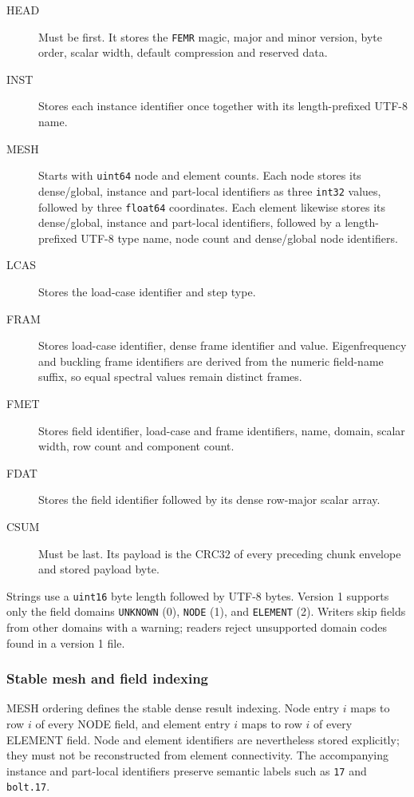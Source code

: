 \begin{description}
  \item[HEAD] Must be first. It stores the \texttt{FEMR} magic, major and minor version, byte order, scalar width, default compression and reserved data.
  \item[INST] Stores each instance identifier once together with its length-prefixed UTF-8 name.
  \item[MESH] Starts with \texttt{uint64} node and element counts. Each node stores its dense/global, instance and part-local identifiers as three \texttt{int32} values, followed by three \texttt{float64} coordinates. Each element likewise stores its dense/global, instance and part-local identifiers, followed by a length-prefixed UTF-8 type name, node count and dense/global node identifiers.
  \item[LCAS] Stores the load-case identifier and step type.
  \item[FRAM] Stores load-case identifier, dense frame identifier and value. Eigenfrequency and buckling frame identifiers are derived from the numeric field-name suffix, so equal spectral values remain distinct frames.
  \item[FMET] Stores field identifier, load-case and frame identifiers, name, domain, scalar width, row count and component count.
  \item[FDAT] Stores the field identifier followed by its dense row-major scalar array.
  \item[CSUM] Must be last. Its payload is the CRC32 of every preceding chunk envelope and stored payload byte.
\end{description}

Strings use a \texttt{uint16} byte length followed by UTF-8 bytes. Version 1 supports only the field domains \texttt{UNKNOWN} (0), \texttt{NODE} (1), and \texttt{ELEMENT} (2). Writers skip fields from other domains with a warning; readers reject unsupported domain codes found in a version 1 file.

\subsubsection{Stable mesh and field indexing}

MESH ordering defines the stable dense result indexing. Node entry $i$ maps to row $i$ of every NODE field, and element entry $i$ maps to row $i$ of every ELEMENT field. Node and element identifiers are nevertheless stored explicitly; they must not be reconstructed from element connectivity. The accompanying instance and part-local identifiers preserve semantic labels such as \texttt{17} and \texttt{bolt.17}.


